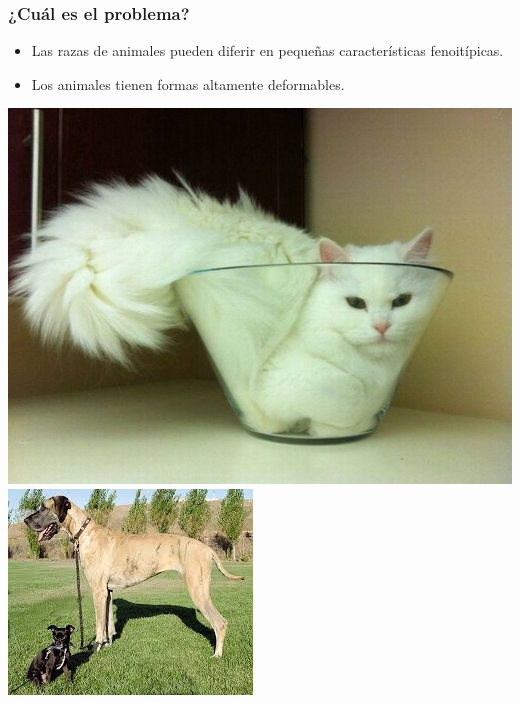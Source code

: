 \documentclass{beamer}
\begin{document}
	\begin{frame}
		\frametitle{¿Cuál es el problema?}
		\begin{itemize}
			\item Las razas de animales pueden diferir en pequeñas características fenoitípicas.
			\item Los animales tienen formas altamente deformables.
		\end{itemize}
        \begin{center}
    		{\includegraphics[scale=0.2]{imagen/fitsisits.jpg}}
	    	{\includegraphics[scale=0.5]{imagen/dogdiff.jpg}}
        \end{center}
	\end{frame}
\end{document}
